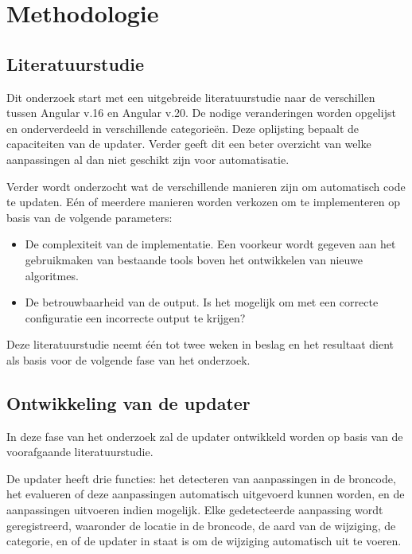 \section{Methodologie}
\label{sec:methodologie}

\subsection{Literatuurstudie}
\label{sec:methodologie:literatuurstudie}

Dit onderzoek start met een uitgebreide literatuurstudie naar de verschillen tussen Angular v.16 en Angular v.20.
De nodige veranderingen worden opgelijst en onderverdeeld in verschillende categorieën.
Deze oplijsting bepaalt de capaciteiten van de updater.
Verder geeft dit een beter overzicht van welke aanpassingen al dan niet geschikt zijn voor automatisatie.

Verder wordt onderzocht wat de verschillende manieren zijn om automatisch code te updaten.
Eén of meerdere manieren worden verkozen om te implementeren op basis van de volgende parameters:
\begin{itemize}
  \item De complexiteit van de implementatie. Een voorkeur wordt gegeven aan het gebruikmaken van bestaande tools boven het ontwikkelen van nieuwe algoritmes.
  \item De betrouwbaarheid van de output. Is het mogelijk om met een correcte configuratie een incorrecte output te krijgen?
\end{itemize}

Deze literatuurstudie neemt één tot twee weken in beslag en het resultaat dient als basis voor de volgende fase van het onderzoek.

\subsection{Ontwikkeling van de updater}

In deze fase van het onderzoek zal de updater ontwikkeld worden op basis van de voorafgaande literatuurstudie.

De updater heeft drie functies: het detecteren van aanpassingen in de broncode, het evalueren of deze aanpassingen automatisch uitgevoerd kunnen worden, en de aanpassingen uitvoeren indien mogelijk.
Elke gedetecteerde aanpassing wordt geregistreerd, waaronder de locatie in de broncode, de aard van de wijziging, de categorie, en of de updater in staat is om de wijziging automatisch uit te voeren.

